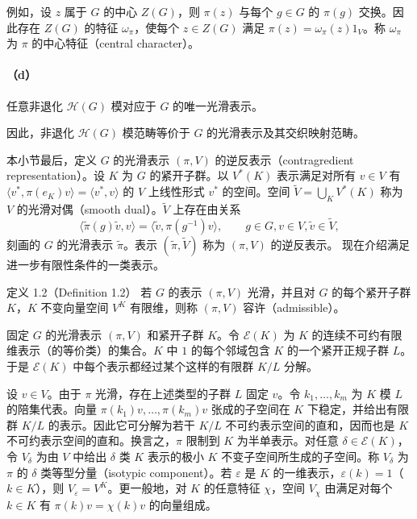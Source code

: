 例如，设 $z$ 属于 $G$ 的中心 $Z(G)$，则 $\pi(z)$ 与每个 $g\in G$ 的 $\pi(g)$ 交换。因此存在 $Z(G)$ 的特征 $\omega_\pi$，使每个 $z\in Z(G)$ 满足 $\pi(z)=\omega_\pi(z)1_V$。称 $\omega_\pi$ 为 $\pi$ 的中心特征（central character）。
\paragraph*{（d）}
任意非退化 $\mathcal H(G)$ 模对应于 $G$ 的唯一光滑表示。

因此，非退化 $\mathcal H(G)$ 模范畴等价于 $G$ 的光滑表示及其交织映射范畴。

本小节最后，定义 $G$ 的光滑表示 $(\pi,V)$ 的逆反表示（contragredient representation）。设 $K$ 为 $G$ 的紧开子群。以 $V^*(K)$ 表示满足对所有 $v\in V$ 有 $\langle v^*,\pi(e_K)v\rangle=\langle v^*,v\rangle$ 的 $V$ 上线性形式 $v^*$ 的空间。空间 $\widetilde V=\bigcup_K V^*(K)$ 称为 $V$ 的光滑对偶（smooth dual）。$\widetilde V$ 上存在由关系
\[
\langle\widetilde\pi(g)\widetilde v,v\rangle=\langle\widetilde v,\pi(g^{-1})v\rangle,\qquad g\in G,v\in V,\widetilde v\in\widetilde V,\tag{10}
\]
刻画的 $G$ 的光滑表示 $\widetilde\pi$。表示 $(\widetilde\pi,\widetilde V)$ 称为 $(\pi,V)$ 的逆反表示。
现在介绍满足进一步有限性条件的一类表示。
\begin{originaltheorem}{定义 1.2（Definition 1.2）}
若 $G$ 的表示 $(\pi,V)$ 光滑，并且对 $G$ 的每个紧开子群 $K$，$K$ 不变向量空间 $V^K$ 有限维，则称 $(\pi,V)$ 容许（admissible）。
\end{originaltheorem}
固定 $G$ 的光滑表示 $(\pi,V)$ 和紧开子群 $K$。令 $\mathcal E(K)$ 为 $K$ 的连续不可约有限维表示（的等价类）的集合。$K$ 中 $1$ 的每个邻域包含 $K$ 的一个紧开正规子群 $L$。于是 $\mathcal E(K)$ 中每个表示都经过某个这样的有限群 $K/L$ 分解。

设 $v\in V$。由于 $\pi$ 光滑，存在上述类型的子群 $L$ 固定 $v$。令 $k_1,\ldots,k_m$ 为 $K$ 模 $L$ 的陪集代表。向量 $\pi(k_1)v,\ldots,\pi(k_m)v$ 张成的子空间在 $K$ 下稳定，并给出有限群 $K/L$ 的表示。因此它可分解为若干 $K/L$ 不可约表示空间的直和，因而也是 $K$ 不可约表示空间的直和。换言之，$\pi$ 限制到 $K$ 为半单表示。对任意 $\delta\in\mathcal E(K)$，令 $V_\delta$ 为由 $V$ 中给出 $\delta$ 类 $K$ 表示的极小 $K$ 不变子空间所生成的子空间。称 $V_\delta$ 为 $\pi$ 的 $\delta$ 类等型分量（isotypic component）。若 $\varepsilon$ 是 $K$ 的一维表示，$\varepsilon(k)=1$（$k\in K$），则 $V_\varepsilon=V^K$。更一般地，对 $K$ 的任意特征 $\chi$，空间 $V_\chi$ 由满足对每个 $k\in K$ 有 $\pi(k)v=\chi(k)v$ 的向量组成。

